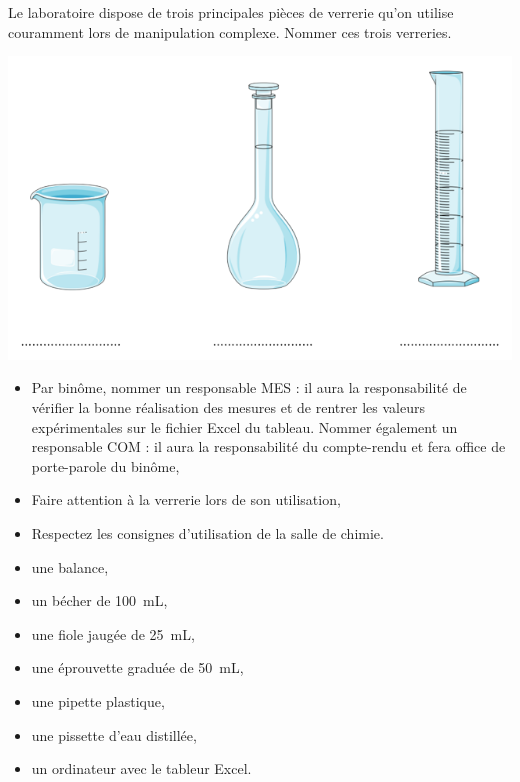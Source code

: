\begin{tcolorbox}[colback=orange!5!white,colframe=orange!75!black,title= Scénario:]
Le laboratoire dispose de trois principales pièces de verrerie qu'on utilise couramment lors de manipulation complexe. Nommer ces trois verreries.
\begin{center}
    \includegraphics[scale=0.7]{Images/TP4/Verrerie_a_completer.png}
\end{center}
\end{tcolorbox}

\begin{tcolorbox}[colback=red!5!white,colframe=red!75!black,title= Consignes :]
\begin{itemize}
    \item Par binôme, nommer un responsable \og MES \fg : il aura la responsabilité de vérifier la bonne réalisation des mesures et de rentrer les valeurs expérimentales sur le fichier Excel du tableau. Nommer également un responsable \og COM \fg : il aura la responsabilité du compte-rendu et fera office de porte-parole du binôme,
    \item Faire attention à la verrerie lors de son utilisation,
    \item Respectez les consignes d'utilisation de la salle de chimie.
\end{itemize}

\end{tcolorbox}
\begin{mdframed}[style=autreexo]
\textbf{}
\begin{itemize}
    \item une balance, 
    \item un bécher de 100~mL,
    \item une fiole jaugée de 25~mL,
    \item une éprouvette graduée de 50~mL,
    \item une pipette plastique,
    \item une pissette d'eau distillée,
    \item un ordinateur avec le tableur Excel.    
\end{itemize}
\end{mdframed}


